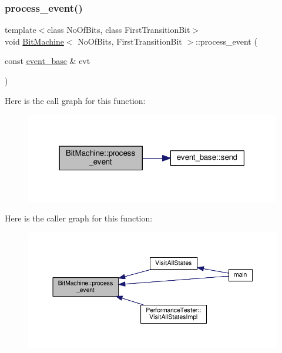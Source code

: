 \subsubsection{\texorpdfstring{process\+\_\+event()}{process\_event()}}
{\footnotesize\ttfamily template$<$class No\+Of\+Bits, class First\+Transition\+Bit$>$ \\
void \mbox{\hyperlink{struct_bit_machine}{Bit\+Machine}}$<$ No\+Of\+Bits, First\+Transition\+Bit $>$\+::process\+\_\+event (\begin{DoxyParamCaption}\item[{const \mbox{\hyperlink{classevent__base}{event\+\_\+base}} \&}]{evt }\end{DoxyParamCaption})\hspace{0.3cm}{\ttfamily [inline]}}

Here is the call graph for this function\+:
\nopagebreak
\begin{figure}[H]
\begin{center}
\leavevmode
\includegraphics[width=316pt]{struct_bit_machine_ae77e5375e470002e98bde6307793b102_cgraph}
\end{center}
\end{figure}
Here is the caller graph for this function\+:
\nopagebreak
\begin{figure}[H]
\begin{center}
\leavevmode
\includegraphics[width=350pt]{struct_bit_machine_ae77e5375e470002e98bde6307793b102_icgraph}
\end{center}
\end{figure}
\mbox{\label{struct_bit_machine_a43a10ef23aab14065277c1bc34d08007}} 
